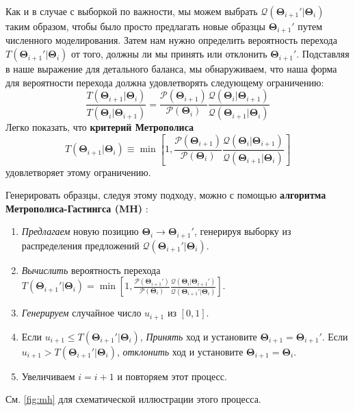 \documentclass[12pt, titlepage]{article}
\newcommand{\params}{\ensuremath{\boldsymbol\Theta}}
\newcommand{\posterior}{\ensuremath{\mathcal{P}}}
\newcommand{\proposal}{\ensuremath{\mathcal{Q}}}
\begin{document}
Как и в случае с выборкой по важности, мы можем выбрать $\proposal(\params_{i+1}'|\params_i)$ таким образом, чтобы было просто предлагать новые образцы $\params_{i+1}'$ путем численного моделирования. Затем нам нужно определить вероятность перехода $T(\params_{i+1}'|\params_i)$ от того, должны ли мы принять или отклонить $\params_{i+1}'$. Подставляя в наше выражение для детального баланса, мы обнаруживаем, что наша форма для вероятности перехода должна удовлетворять следующему ограничению:
\begin{equation}
    \frac{T(\params_{i+1}|\params_i)}{T(\params_i|\params_{i+1})} 
    = \frac{\posterior(\params_{i+1})}{\posterior(\params_i)}
    \frac{\proposal(\params_i|\params_{i+1})}{\proposal(\params_{i+1}|\params_i)}
\end{equation}
Легко показать, что \textbf{критерий Метрополиса} \cite{metropolis+53_alt}
\begin{equation}
    T(\params_{i+1}|\params_i)
    \equiv \min\left[1, \frac{\posterior(\params_{i+1})}{\posterior(\params_i)}
    \frac{\proposal(\params_i|\params_{i+1})}{\proposal(\params_{i+1}|\params_i)}
    \right]
\end{equation}
удовлетворяет этому ограничению.

Генерировать образцы, следуя этому подходу, можно с помощью \textbf{алгоритма Метрополиса-Гастингса (MH)} \citep{metropolis+53_alt,hastings70}:
	\begin{enumerate}
		\item \textit{Предлагаем} новую позицию $\params_i \rightarrow \params_{i+1}'$, генерируя выборку из распределения предложений $\proposal(\params_{i+1}'|\params_i)$.
		\item \textit{Вычислить} вероятность перехода $T(\params_{i+1}'|\params_i)
		= \min\left[1, \frac{\posterior(\params_{i+1}')}{\posterior(\params_i)}
		\frac{\proposal(\params_i|\params_{i+1}')}{\proposal(\params_{i+1}'|\params_i)}
		\right]$.
		\item \textit{Генерируем} случайное число $u_{i+1}$ из $[0, 1]$.
		\item Если $u_{i+1} \leq T(\params_{i+1}'|\params_i)$, \textit{Принять} ход и установите $\params_{i+1} = \params_{i+1}'$. 
		Если $u_{i+1} > T(\params_{i+1}'|\params_i)$, \textit{отклонить} ход и установите $\params_{i+1} = \params_i$.
		\item Увеличиваем $i = i + 1$ и повторяем этот процесс.
	\end{enumerate}
	См. {\color{red} \autoref{fig:mh}} для схематической иллюстрации этого процесса.
\end{document}

